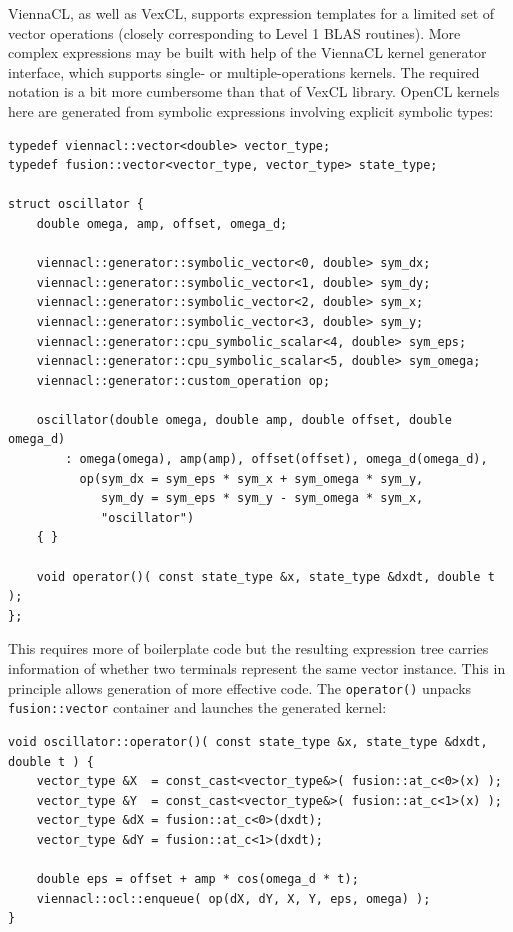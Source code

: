 \documentclass[final]{siamltex}
\newcommand{\code}[1]{\lstinline|#1|}
\begin{document}
ViennaCL, as well as VexCL, supports expression templates for a limited set of
vector operations (closely corresponding to Level 1 BLAS routines). More
complex expressions may be built with help of the ViennaCL kernel generator
interface, which supports single- or multiple-operations kernels. The required
notation is a bit more cumbersome than that of VexCL library. OpenCL kernels
here are generated from symbolic expressions involving explicit symbolic types:
\begin{lstlisting}
typedef viennacl::vector<double> vector_type;
typedef fusion::vector<vector_type, vector_type> state_type;

struct oscillator {
    double omega, amp, offset, omega_d;

    viennacl::generator::symbolic_vector<0, double> sym_dx;
    viennacl::generator::symbolic_vector<1, double> sym_dy;
    viennacl::generator::symbolic_vector<2, double> sym_x;
    viennacl::generator::symbolic_vector<3, double> sym_y;
    viennacl::generator::cpu_symbolic_scalar<4, double> sym_eps;
    viennacl::generator::cpu_symbolic_scalar<5, double> sym_omega;
    viennacl::generator::custom_operation op;

    oscillator(double omega, double amp, double offset, double omega_d)
        : omega(omega), amp(amp), offset(offset), omega_d(omega_d),
          op(sym_dx = sym_eps * sym_x + sym_omega * sym_y,
             sym_dy = sym_eps * sym_y - sym_omega * sym_x,
             "oscillator")
    { }

    void operator()( const state_type &x, state_type &dxdt, double t );
};
\end{lstlisting}

This requires more of boilerplate code but the resulting expression tree
carries information of whether two terminals represent the same vector
instance. This in principle allows generation of more effective code. The
\code{operator()} unpacks \code{fusion::vector} container and launches
the generated kernel:
\begin{lstlisting}[firstnumber=24]
void oscillator::operator()( const state_type &x, state_type &dxdt, double t ) {
    vector_type &X  = const_cast<vector_type&>( fusion::at_c<0>(x) );
    vector_type &Y  = const_cast<vector_type&>( fusion::at_c<1>(x) );
    vector_type &dX = fusion::at_c<0>(dxdt);
    vector_type &dY = fusion::at_c<1>(dxdt);

    double eps = offset + amp * cos(omega_d * t);
    viennacl::ocl::enqueue( op(dX, dY, X, Y, eps, omega) );
}
\end{lstlisting}
\end{document}
